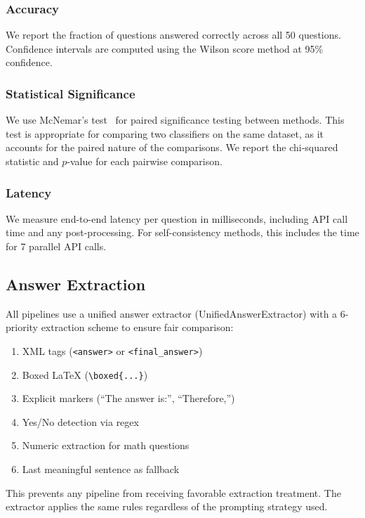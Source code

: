 \subsubsection{Accuracy}
We report the fraction of questions answered correctly across all 50 questions. Confidence intervals are computed using the Wilson score method at 95\% confidence.

\subsubsection{Statistical Significance}
We use McNemar's test~\cite{mcnemar1947note} for paired significance testing between methods. This test is appropriate for comparing two classifiers on the same dataset, as it accounts for the paired nature of the comparisons. We report the chi-squared statistic and $p$-value for each pairwise comparison.

\subsubsection{Latency}
We measure end-to-end latency per question in milliseconds, including API call time and any post-processing. For self-consistency methods, this includes the time for 7 parallel API calls.

\subsection{Answer Extraction}
All pipelines use a unified answer extractor (UnifiedAnswerExtractor) with a 6-priority extraction scheme to ensure fair comparison:

\begin{enumerate}
\item XML tags (\texttt{<answer>} or \texttt{<final\_answer>})
\item Boxed LaTeX (\texttt{\textbackslash boxed\{...\}})
\item Explicit markers (``The answer is:'', ``Therefore,'')
\item Yes/No detection via regex
\item Numeric extraction for math questions
\item Last meaningful sentence as fallback
\end{enumerate}

This prevents any pipeline from receiving favorable extraction treatment. The extractor applies the same rules regardless of the prompting strategy used.

